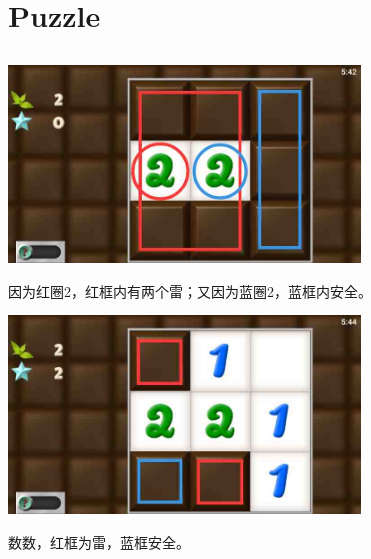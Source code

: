 \section{Puzzle}\label{puzzle}
\subsection{} %
\begin{center}
    \includegraphics[width=0.7\textwidth]{puzzlelow/1-1.jpg}
\end{center}
因为红圈2，红框内有两个雷；又因为蓝圈2，蓝框内安全。
\begin{center}
    \includegraphics[width=0.7\textwidth]{puzzlelow/1-2.jpg}
\end{center}
数数，红框为雷，蓝框安全。

